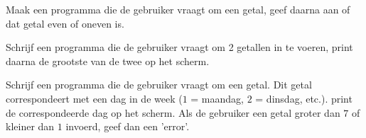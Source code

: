 \begin{exercise}
Maak een programma die de gebruiker vraagt om een getal, geef daarna aan of dat getal even of oneven is.
\end{exercise}

\begin{exercise}
Schrijf een programma die de gebruiker vraagt om 2 getallen in te voeren, print daarna de grootste van de twee op het scherm. 
\end{exercise}

\begin{exercise}
Schrijf een programma die de gebruiker vraagt om een getal. Dit getal correspondeert met een dag in de week ($1$ = maandag, $2$ = dinsdag, etc.). print de correspondeerde dag op het scherm. Als de gebruiker een getal groter dan $7$ of kleiner dan $1$ invoerd, geef dan een 'error'.
\end{exercise}


